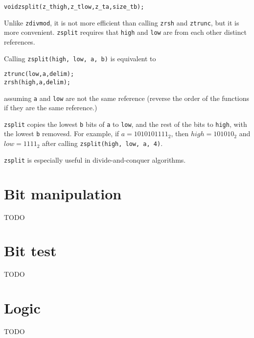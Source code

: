\begin{alltt}
   void zsplit(z_t high, z_t low, z_t a, size_t b);
\end{alltt}

\noindent
Unlike {\tt zdivmod}, it is not more efficient
than calling {\tt zrsh} and {\tt ztrunc}, but
it is more convenient. {\tt zsplit} requires
that {\tt high} and {\tt low} are from each
other distinct references.

Calling {\tt zsplit(high, low, a, b)} is
equivalent to

\begin{alltt}
   ztrunc(low, a, delim);
   zrsh(high, a, delim);
\end{alltt}

\noindent
assuming {\tt a} and {\tt low} are not the
same reference (reverse the order of the
functions if they are the same reference.)

{\tt zsplit} copies the lowest {\tt b} bits
of {\tt a} to {\tt low}, and the rest of the
bits to {\tt high}, with the lowest {\tt b}
removesd. For example, if $a = 1010101111_2$,
then $high = 101010_2$ and $low = 1111_2$
after calling {\tt zsplit(high, low, a, 4)}.

{\tt zsplit} is especially useful in
divide-and-conquer algorithms.


\newpage
\section{Bit manipulation}
\label{sec:Bit manipulation}

TODO %


\newpage
\section{Bit test}
\label{sec:Bit test}

TODO %


\newpage
\section{Logic}
\label{sec:Logic}

TODO %
